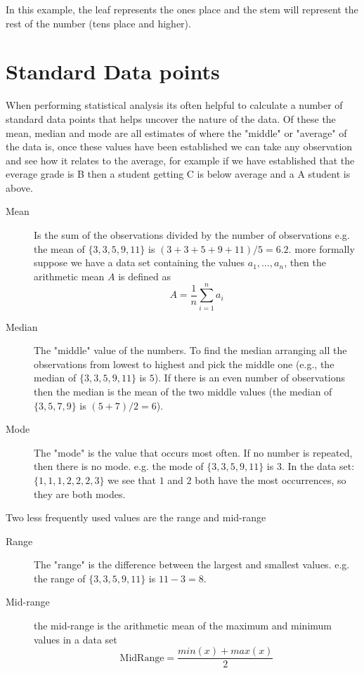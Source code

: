 In this example, the leaf represents the ones place and the stem will represent the rest of the number (tens place and higher).

\section{Standard Data points}
When performing statistical analysis its often helpful to calculate a number of standard data points that helps uncover the nature of the data. Of these the mean, median and mode are all estimates of where the "middle" or "average" of the data is, once these values have been established we can take any observation and see how it relates to the average, for example if we have established that the everage grade is B then a student getting C is below average and a A student is above.

\begin{description}
\item [Mean] Is the sum of the observations divided by the number of observations e.g. the mean of $\{3, 3, 5, 9, 11\}$ is $(3 + 3 + 5 + 9 + 11)/5 = 6.2$. more formally suppose we have a data set containing the values $a_1,\ldots,a_n$, then the arithmetic mean $A$ is defined as
\begin{equation}
A = \frac{1}{n}\sum_{i=1}^{n} a_i
\end{equation}
\item [Median] The "middle" value of the numbers. To find the median arranging all the observations from lowest to highest and pick the middle one (e.g., the median of $\{3, 3, 5, 9, 11\}$ is $5$). If there is an even number of observations then the median is the mean of the two middle values (the median of $\{3, 5, 7, 9\}$ is $(5 + 7) / 2 = 6$).
\item [Mode] The "mode" is the value that occurs most often. If no number is repeated, then there is no mode. e.g. the mode of $\{3, 3, 5, 9, 11\}$ is $3$. In the data set:
$\{1, 1, 1, 2, 2, 2, 3\}$ we see that $1$ and $2$ both have the most occurrences, so they are both modes.
\end{description}

Two less frequently used values are the range and mid-range

\begin{description}
\item [Range] The "range" is the difference between the largest and smallest values. e.g. the range of $\{3, 3, 5, 9, 11\}$ is $11-3=8$.
\item [Mid-range] the mid-range is the arithmetic mean of the maximum and minimum values in a data set
\[
\textrm{MidRange} = \frac{min(x) + max(x)}{2}
\]
\end{description}

